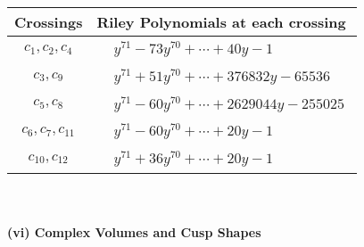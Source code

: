 \documentclass[1p]{elsarticle_modified}
\theoremstyle{definition}
\begin{document}
\begin{tabular}{m{50pt}|m{274pt}}
Crossings & \hspace{64pt}Riley Polynomials at each crossing \\
\hline $$\begin{aligned}c_{1},c_{2},c_{4}\end{aligned}$$&$\begin{aligned}
&y^{71}-73 y^{70}+\cdots+40 y-1
\end{aligned}$\\
\hline $$\begin{aligned}c_{3},c_{9}\end{aligned}$$&$\begin{aligned}
&y^{71}+51 y^{70}+\cdots+376832 y-65536
\end{aligned}$\\
\hline $$\begin{aligned}c_{5},c_{8}\end{aligned}$$&$\begin{aligned}
&y^{71}-60 y^{70}+\cdots+2629044 y-255025
\end{aligned}$\\
\hline $$\begin{aligned}c_{6},c_{7},c_{11}\end{aligned}$$&$\begin{aligned}
&y^{71}-60 y^{70}+\cdots+20 y-1
\end{aligned}$\\
\hline $$\begin{aligned}c_{10},c_{12}\end{aligned}$$&$\begin{aligned}
&y^{71}+36 y^{70}+\cdots+20 y-1
\end{aligned}$\\
\hline
\end{tabular}\\~\\
\newpage\flushleft \textbf{(vi) Complex Volumes and Cusp Shapes}
\end{document}
